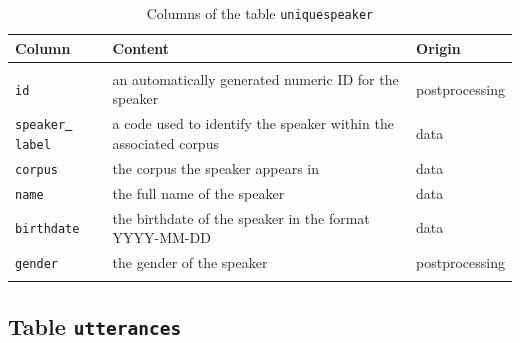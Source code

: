 \documentclass[a4paper, 11pt]{book}
\newcommand{\und}{\underline{{ }}\hspace{0.2mm}}	%
\begin{document}
\begin{longtable}{lp{.5\linewidth}p{.2\linewidth}}
	\toprule
		\textbf{Column} & \textbf{Content} 	& \textbf{Origin} \\
	\midrule
	\endhead
	
	\bottomrule\\[-0.15cm]
	\caption{Columns of the table \texttt{uniquespeaker}}
	\endfoot
	
		\texttt{id} 		& an automatically generated numeric ID for the speaker & postprocessing \\
		\texttt{speaker\und label} & a code used to identify the speaker within the associated corpus & data \\
		\texttt{corpus} 	& the corpus the speaker appears in & data \\ 
		\texttt{name}		& the full name of the speaker & data \\
		\texttt{birthdate} 	& the birthdate of the speaker in the format YYYY-MM-DD & data \\ 
		\texttt{gender} 	& the gender of the speaker & postprocessing \\[-0.3cm]
	\label{tab:Table uniquespeakers}
\end{longtable}


\subsection{Table \texttt{utterances}}
\label{subsec:Table utterances}
\end{document}

